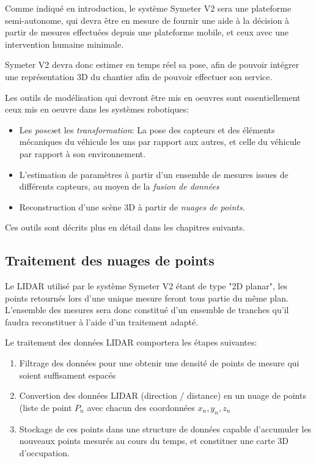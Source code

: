 \documentclass[12pt,a4paper]{report}
\begin{document}
	\para Comme indiqué en introduction, le système Symeter V2 sera une plateforme semi-autonome, qui devra être en mesure de fournir une aide à la décision à partir de mesures effectuées depuis une plateforme mobile, et ceux avec une intervention humaine minimale.
	
	\para Symeter V2 devra donc estimer en temps réel sa pose, afin de pouvoir intégrer une représentation 3D du chantier afin de pouvoir effectuer son service.
	
	\para Les outils de modélisation qui devront être mis en oeuvres sont essentiellement ceux mis en oeuvre dans les systèmes robotiques:
	 \begin{itemize}
	 	\item Les \textit{poses}et les \textit{transformation}: La pose des capteurs et des éléments mécaniques du véhicule les uns par rapport aux autres, et celle du véhicule par rapport à son environnement.
	 	\item L'estimation de paramètres à partir d'un ensemble de mesures issues de différents capteurs, au moyen de la \textit{fusion de données}
	 	\item Reconstruction d'une scène 3D à partir de \textit{nuages de points}.
	 \end{itemize} 
 
   \para Ces outils sont décrits plus en détail dans les chapitres suivants.
		
			
		
			
		
		\subsection{Traitement des nuages de points}
		Le LIDAR utilisé par le système Symeter V2 étant de type "2D planar", les points retournés lors d'une unique mesure feront tous partie du même plan. L'ensemble des mesures sera donc constitué d'un ensemble de tranches qu'il faudra reconstituer à l'aide d'un traitement adapté.
		
		\para Le traitement des données LIDAR comportera les étapes suivantes:
		\begin{enumerate}
			\item Filtrage des données pour une obtenir une densité de points de mesure qui soient suffisament espacés
			\item Convertion des données LIDAR (direction / distance) en un nuage de points (liste de point $P_n$ avec chacun des coordonnées $x_n, y_n, z_n$
			\item Stockage de ces points dans une structure de données capable d'accumuler les nouveaux points mesurés au cours du temps, et constituer une carte 3D d'occupation.
 		\end{enumerate}
 	
\end{document}
